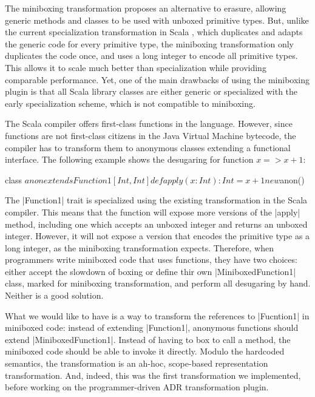 The miniboxing transformation \cite{miniboxing} proposes an alternative to erasure, allowing generic methods and classes to be used with unboxed primitive types. But, unlike the current specialization transformation in Scala \cite{iuli-thesis}, which duplicates and adapts the generic code for every primitive type, the miniboxing transformation only duplicates the code once, and uses a long integer to encode all primitive types. This allows it to scale much better than specialization \cite{miniboxing-linkedlist} while providing comparable performance. Yet, one of the main drawbacks of using the miniboxing plugin is that all Scala library classes are either generic or specialized with the early specialization scheme, which is not compatible to miniboxing.

The Scala compiler offers first-class functions in the language. However, since functions are not first-class citizens in the Java Virtual Machine bytecode, the compiler has to transform them to anonymous classes extending a functional interface. The following example shows the desugaring for function $x => x + 1$:

\begin{lstlisting-nobreak}
class $anon extends Function1[Int, Int] {
  def apply(x: Int): Int = x + 1
}
new $anon()
\end{lstlisting-nobreak}

The |Function1| trait is specialized using the existing transformation in the Scala compiler. This means that the function will expose more versions of the |apply| method, including one which accepts an unboxed integer and returns an unboxed integer. However, it will not expose a version that encodes the primitive type as a long integer, as the miniboxing transformation expects. Therefore, when programmers write miniboxed code that uses functions, they have two choices: either accept the slowdown of boxing or define thir own |MiniboxedFunction1| class, marked for miniboxing transformation, and perform all desugaring by hand. Neither is a good solution.

What we would like to have is a way to transform the references to |Fucntion1| in miniboxed code: instead of extending |Function1|, anonymous functions should extend |MiniboxedFunction1|. Instead of having to box to call a method, the miniboxed code should be able to invoke it directly. Modulo the hardcoded semantics, the transformation is an ah-hoc, scope-based representation transformation. And, indeed, this was the first transformation we implemented, before working on the programmer-driven ADR transformation plugin.

